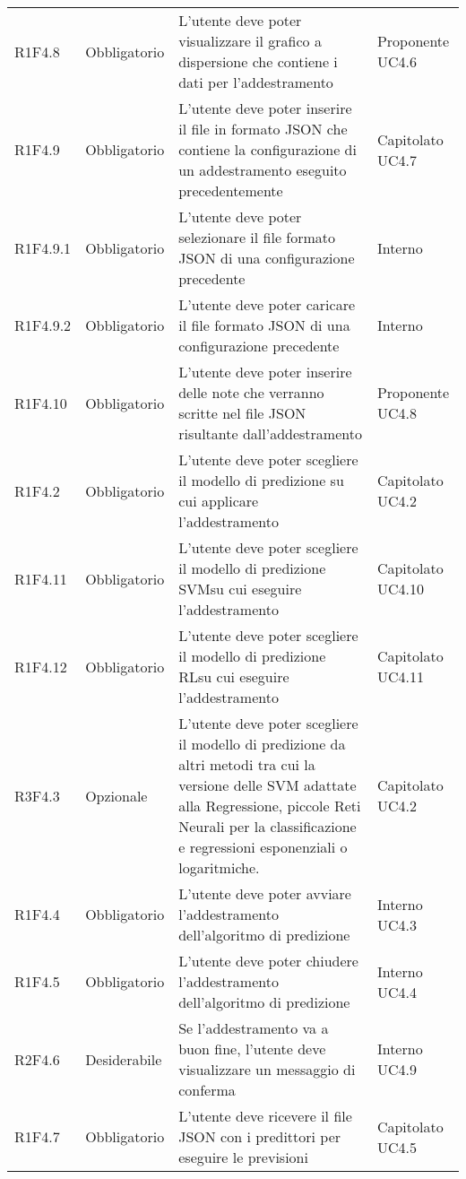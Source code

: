\begin{longtable} {
		>{}p{24mm} 
		>{}p{32mm}
		>{}p{40mm} 
		>{}p{24.5mm}
		}
		R1F4.8 & Obbligatorio & L'utente deve poter visualizzare il grafico a dispersione che contiene i dati per l'addestramento & Proponente UC4.6 \TBstrut \\ [2mm]
		R1F4.9 & Obbligatorio & L'utente deve poter inserire il file in formato JSON che contiene la configurazione di un addestramento eseguito precedentemente & Capitolato UC4.7 \TBstrut \\ [2mm]
		R1F4.9.1 & Obbligatorio & L'utente deve poter selezionare il file formato JSON di una configurazione precedente & Interno \TBstrut \\ [2mm]
		R1F4.9.2 & Obbligatorio & L'utente deve poter caricare il file formato JSON di una configurazione precedente & Interno \TBstrut \\ [2mm]
		R1F4.10 & Obbligatorio & L'utente deve poter inserire delle note che verranno scritte nel file JSON risultante dall'addestramento & Proponente UC4.8 \TBstrut \\ [2mm]	
		R1F4.2 & Obbligatorio & L'utente deve poter scegliere il modello di predizione su cui applicare l'addestramento & Capitolato UC4.2 \TBstrut \\ [2mm]
		R1F4.11 & Obbligatorio & L'utente deve poter scegliere il modello di predizione SVM\glosp su cui eseguire l'addestramento & Capitolato UC4.10 \TBstrut \\ [2mm]
		R1F4.12 & Obbligatorio & L'utente deve poter scegliere il modello di predizione RL\glosp su cui eseguire l'addestramento & Capitolato UC4.11 \TBstrut \\ [2mm]
		R3F4.3 & Opzionale & L'utente deve poter scegliere il modello di predizione da altri metodi tra cui la versione delle SVM adattate alla Regressione, piccole Reti Neurali per la classificazione e regressioni esponenziali o logaritmiche. & Capitolato UC4.2 \TBstrut \\ [2mm]				
		R1F4.4 & Obbligatorio & L'utente deve poter avviare l'addestramento dell'algoritmo di predizione & Interno UC4.3 \TBstrut \\ [2mm]
		R1F4.5 & Obbligatorio & L'utente deve poter chiudere l'addestramento dell'algoritmo di predizione & Interno UC4.4 \TBstrut \\ [2mm]		
		R2F4.6 & Desiderabile & Se l'addestramento va a buon fine, l'utente deve visualizzare un messaggio di conferma & Interno UC4.9 \TBstrut \\ [2mm]		
		R1F4.7 & Obbligatorio & L'utente deve ricevere il file JSON con i predittori per eseguire le previsioni & Capitolato UC4.5 \TBstrut \\ [2mm]

\end{longtable}
